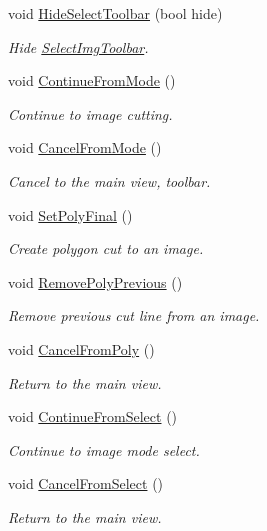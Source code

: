 \begin{DoxyCompactItemize}
void \mbox{\hyperlink{classGUI_a7f6d3b1fcbd874fccd93c5f29c468ed8}{Hide\+Select\+Toolbar}} (bool hide)
\begin{DoxyCompactList}\small\item\em Hide \mbox{\hyperlink{structSelectImgToolbar}{Select\+Img\+Toolbar}}. \end{DoxyCompactList}\item 
void \mbox{\hyperlink{classGUI_a3547730e0fae81b59fcb19d00a370782}{Continue\+From\+Mode}} ()
\begin{DoxyCompactList}\small\item\em Continue to image cutting. \end{DoxyCompactList}\item 
void \mbox{\hyperlink{classGUI_a8188dd01b2dc9354afbbf2f4b18fd19a}{Cancel\+From\+Mode}} ()
\begin{DoxyCompactList}\small\item\em Cancel to the main view, toolbar. \end{DoxyCompactList}\item 
void \mbox{\hyperlink{classGUI_a6bf2d3ef382340365b5693245a2bd955}{Set\+Poly\+Final}} ()
\begin{DoxyCompactList}\small\item\em Create polygon cut to an image. \end{DoxyCompactList}\item 
void \mbox{\hyperlink{classGUI_abf8e1050ae4d599bf35af7b1f841d960}{Remove\+Poly\+Previous}} ()
\begin{DoxyCompactList}\small\item\em Remove previous cut line from an image. \end{DoxyCompactList}\item 
void \mbox{\hyperlink{classGUI_a9f2b3abf533a7c720b817caed653da2e}{Cancel\+From\+Poly}} ()
\begin{DoxyCompactList}\small\item\em Return to the main view. \end{DoxyCompactList}\item 
void \mbox{\hyperlink{classGUI_a0cddf3859f457495040857f4868f32e3}{Continue\+From\+Select}} ()
\begin{DoxyCompactList}\small\item\em Continue to image mode select. \end{DoxyCompactList}\item 
void \mbox{\hyperlink{classGUI_a3e6d9c2c9482bf8cb9655899b36e8bc1}{Cancel\+From\+Select}} ()
\begin{DoxyCompactList}\small\item\em Return to the main view. \end{DoxyCompactList}\item 

\end{DoxyCompactItemize}
